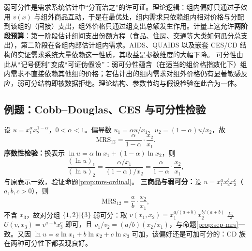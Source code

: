 \begin{remark}
\label{rem:two-stage}
弱可分性是需求系统估计中“分而治之”的许可证。理论逻辑：组内偏好只通过子效用 $v(x)$ 与组外商品互动，于是在最优处，组内需求只依赖组内相对价格与分配到该组的（间接）支出，组外价格只通过组支出总额发生作用。计量上这允许\textbf{两阶段预算}：第一阶段估计组间支出份额方程（食品、住房、交通等大类如何瓜分总支出），第二阶段在各组内部估计组内需求。AIDS、QUAIDS 以及嵌套 CES/CD 结构的实证需求系统大量依赖这一性质，其收益是参数维度的大幅下降。
可分性由此从“记号便利”变成“可证伪假设”：弱可分性蕴含（在适当的组价格指数化下）组内需求不直接依赖其他组的价格；若估计出的组内需求对组外价格仍有显著敏感反应，弱可分结构即被数据拒绝。理论结构、参数节约与假设检验在此合为一体。
\end{remark}

\subsection{例题：Cobb--Douglas、CES 与可分性检验}
\label{sec:mrs-examples}

\begin{example}
\label{ex:cd-mrs}
设 $u=x_1^{\alpha}x_2^{1-\alpha}$，$0<\alpha<1$。偏导数 $u_1=\alpha u/x_1$、$u_2=(1-\alpha)u/x_2$，故
\[
 \mathrm{MRS}_{12}=\frac{\alpha}{1-\alpha}\cdot\frac{x_2}{x_1}.
\]
\textbf{序数性检验：}换表示 $\ln u=\alpha\ln x_1+(1-\alpha)\ln x_2$，则
\[
 \frac{(\ln u)_1}{(\ln u)_2}=\frac{\alpha/x_1}{(1-\alpha)/x_2}
 =\frac{\alpha}{1-\alpha}\cdot\frac{x_2}{x_1},
\]
与原表示一致，验证命题\ref{prop:mrs-ordinal}。
\textbf{三商品与弱可分：}设 $u=x_1^{a}x_2^{b}x_3^{c}$（$a,b,c>0$），则
\[
 \mathrm{MRS}_{12}=\frac{a}{b}\cdot\frac{x_2}{x_1},
\]
不含 $x_3$，故对分组 $\{1,2\}|\{3\}$ 弱可分：取 $v(x_1,x_2)=x_1^{a/(a+b)}x_2^{b/(a+b)}$ 与 $U(v,x_3)=v^{a+b}x_3^{c}$ 即可，且 $v_1/v_2=(a/b)(x_2/x_1)$，与命题\ref{prop:sep-mrs}一致。又因 $\ln u=a\ln x_1+b\ln x_2+c\ln x_3$ 可加，该偏好还是可加可分的：CD 族在两种可分性下都表现良好。
\end{example}

